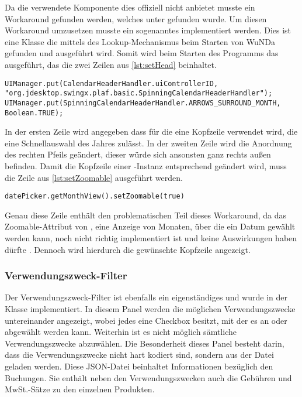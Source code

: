 Da die verwendete Komponente  dies offiziell nicht anbietet musste ein Workaround gefunden werden, welches unter \autocite{so-jxdatepicker} gefunden wurde.
Um diesen Workaround umzusetzen musste ein sogenanntes  implementiert werden. 
Dies ist eine Klasse die mittels des Lookup-Mechanismus beim Starten von \ac{WuNDa} gefunden und ausgeführt wird.
Somit wird beim Starten des Programms das   ausgeführt, das die zwei Zeilen aus \autoref{lst:setHead} beinhaltet.\\
\begin{minipage}{\textwidth}
\begin{lstlisting}[caption=innerhalb \texttt{JXDatePickerHeaderTakeoff}, label=lst:setHead]
UIManager.put(CalendarHeaderHandler.uiControllerID, "org.jdesktop.swingx.plaf.basic.SpinningCalendarHeaderHandler");
UIManager.put(SpinningCalendarHeaderHandler.ARROWS_SURROUND_MONTH, Boolean.TRUE);
\end{lstlisting}
\end{minipage}

In der ersten Zeile wird angegeben dass für die  eine Kopfzeile verwendet wird, die eine Schnellauswahl des Jahres zulässt.
In der zweiten Zeile wird die Anordnung des rechten Pfeils geändert, dieser würde sich ansonsten ganz rechts außen befinden.
Damit die Kopfzeile einer -Instanz  entsprechend geändert wird, muss die Zeile aus \autoref{lst:setZoomable} ausgeführt werden.\\
\begin{minipage}{\textwidth}
\begin{lstlisting}[caption=Setzen der Kopfzeile, label=lst:setZoomable]
datePicker.getMonthView().setZoomable(true)
\end{lstlisting}
\end{minipage}

Genau diese Zeile enthält den problematischen Teil dieses Workaround, da das Zoomable-Attribut von , eine Anzeige von Monaten, über die ein Datum gewählt werden kann, noch nicht richtig implementiert ist und keine Auswirkungen haben dürfte \autocite[vgl.][]{swingx-jxdatepicker}.
Dennoch wird hierdurch die gewünschte Kopfzeile angezeigt.

\subsubsection{Verwendungszweck-Filter}
Der Verwendungszweck-Filter ist ebenfalls ein eigenständiges  und wurde in der Klasse  implementiert.
In diesem Panel werden die möglichen Verwendungszwecke untereinander angezeigt, wobei jedes eine Checkbox besitzt, mit der es an oder abgewählt werden kann. Weiterhin ist es nicht möglich sämtliche Verwendungszwecke abzuwählen.
Die Besonderheit dieses Panel besteht darin, dass die Verwendungszwecke nicht hart kodiert sind, sondern aus der  Datei geladen werden.
Diese \ac{JSON}-Datei beinhaltet Informationen bezüglich den Buchungen. Sie enthält neben den Verwendungszwecken auch die Gebühren und MwSt.-Sätze zu den einzelnen Produkten. 

